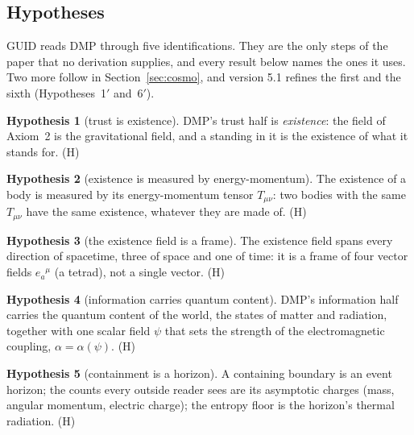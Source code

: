 \documentclass[11pt,a4paper]{article}
\theoremstyle{definition}
\newtheorem{hypothesis}{Hypothesis}
\theoremstyle{remark}
\newcommand{\tagH}{\textsf{(H)}}
\newcommand{\nw}[1]{{\color{newc}#1}}
\newcommand{\vtag}{{\color{newc}\textsf{\scriptsize[v5.1]}}}
\theoremstyle{definition}
\begin{document}
\subsection{Hypotheses}

GUID reads DMP through five identifications. They are the only steps of the paper that no derivation supplies, and every result below
names the ones it uses. \nw{\vtag{} Two more follow in Section~\ref{sec:cosmo}, and version 5.1 refines the first and the sixth
(Hypotheses~1$'$ and~6$'$).}

\begin{hypothesis}[trust is existence]\label{h:exist}
DMP's trust half is \emph{existence}: the field of Axiom~2 is the gravitational field, and a standing in it is the existence of what it
stands for. \tagH
\end{hypothesis}

\begin{hypothesis}[existence is measured by energy-momentum]\label{h:energy}
The existence of a body is measured by its energy-momentum tensor $T_{\mu\nu}$: two bodies with the same $T_{\mu\nu}$ have the same
existence, whatever they are made of. \tagH
\end{hypothesis}

\begin{hypothesis}[the existence field is a frame]\label{h:frame}
The existence field spans every direction of spacetime, three of space and one of time: it is a frame of four vector fields
$e_a{}^{\mu}$ (a tetrad), not a single vector. \tagH
\end{hypothesis}

\begin{hypothesis}[information carries quantum content]\label{h:info}
DMP's information half carries the quantum content of the world, the states of matter and radiation, together with one scalar field
$\psi$ that sets the strength of the electromagnetic coupling, $\alpha=\alpha(\psi)$. \tagH
\end{hypothesis}

\begin{hypothesis}[containment is a horizon]\label{h:horizon}
A containing boundary is an event horizon; the counts every outside reader sees are its asymptotic charges (mass, angular momentum,
electric charge); the entropy floor is the horizon's thermal radiation. \tagH
\end{hypothesis}
\end{document}
